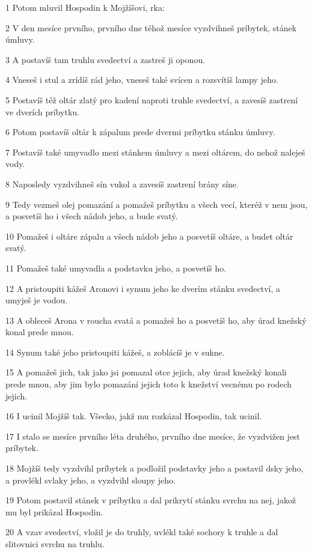\par 1 Potom mluvil Hospodin k Mojžíšovi, rka:
\par 2 V den mesíce prvního, prvního dne téhož mesíce vyzdvihneš príbytek, stánek úmluvy.
\par 3 A postavíš tam truhlu svedectví a zastreš ji oponou.
\par 4 Vneseš i stul a zrídíš rád jeho, vneseš také svícen a rozsvítíš lampy jeho.
\par 5 Postavíš též oltár zlatý pro kadení naproti truhle svedectví, a zavesíš zastrení ve dverích príbytku.
\par 6 Potom postavíš oltár k zápalum prede dvermi príbytku stánku úmluvy.
\par 7 Postavíš také umyvadlo mezi stánkem úmluvy a mezi oltárem, do nehož naleješ vody.
\par 8 Naposledy vyzdvihneš sín vukol a zavesíš zastrení brány síne.
\par 9 Tedy vezmeš olej pomazání a pomažeš príbytku a všech vecí, kteréž v nem jsou, a posvetíš ho i všech nádob jeho, a bude svatý.
\par 10 Pomažeš i oltáre zápalu a všech nádob jeho a posvetíš oltáre, a budet oltár svatý.
\par 11 Pomažeš také umyvadla a podstavku jeho, a posvetíš ho.
\par 12 A pristoupiti kážeš Aronovi i synum jeho ke dverím stánku svedectví, a umyješ je vodou.
\par 13 A obleceš Arona v roucha svatá a pomažeš ho a posvetíš ho, aby úrad knežský konal prede mnou.
\par 14 Synum také jeho pristoupiti kážeš, a zoblácíš je v sukne.
\par 15 A pomažeš jich, tak jako jsi pomazal otce jejich, aby úrad knežský konali prede mnou, aby jim bylo pomazání jejich toto k knežství vecnému po rodech jejich.
\par 16 I ucinil Mojžíš tak. Všecko, jakž mu rozkázal Hospodin, tak ucinil.
\par 17 I stalo se mesíce prvního léta druhého, prvního dne mesíce, že vyzdvižen jest príbytek.
\par 18 Mojžíš tedy vyzdvihl príbytek a podložil podstavky jeho a postavil dsky jeho, a provlékl svlaky jeho, a vyzdvihl sloupy jeho.
\par 19 Potom postavil stánek v príbytku a dal prikrytí stánku svrchu na nej, jakož mu byl prikázal Hospodin.
\par 20 A vzav svedectví, vložil je do truhly, uvlékl také sochory k truhle a dal slitovnici svrchu na truhlu.
